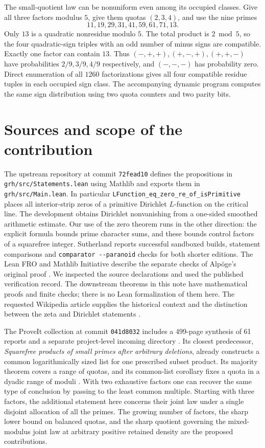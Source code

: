 \documentclass[11pt]{article}
\begin{document}
The small-quotient law can be nonuniform even among its occupied classes. Give all three factors modulus $5$, give them quotas $(2,3,4)$, and use the nine primes
\[
 11,19,29,31,41,59,61,71,13.
\]
Only $13$ is a quadratic nonresidue modulo $5$. The total product is $2\bmod5$, so the four quadratic-sign triples with an odd number of minus signs are compatible. Exactly one factor can contain $13$. Thus $(-,+,+),(+,-,+),(+,+,-)$ have probabilities $2/9,3/9,4/9$ respectively, and $(-,-,-)$ has probability zero. Direct enumeration of all $1260$ factorizations gives all four compatible residue tuples in each occupied sign class. The accompanying dynamic program computes the same sign distribution using two quota counters and two parity bits.

\section{Sources and scope of the contribution}
The upstream repository at commit \texttt{72fead10} defines the propositions in \nolinkurl{grh/src/Statements.lean} using Mathlib and exports them in \nolinkurl{grh/src/Main.lean}. In particular \nolinkurl{LFunction_eq_zero_re_of_isPrimitive} places all interior-strip zeros of a primitive Dirichlet $L$-function on the critical line. The development obtains Dirichlet nonvanishing from a one-sided smoothed arithmetic estimate. Our use of the zero theorem runs in the other direction: the explicit formula bounds prime character sums, and these bounds control factors of a squarefree integer. Sutherland reports successful sandboxed builds, statement comparisons and \nolinkurl{comparator --paranoid} checks for both shorter editions. The Lean FRO and Mathlib Initiative describe the separate checks of Alp\"oge's original proof \cite{lean,suth,fro}. We inspected the source declarations and used the published verification record. The downstream theorems in this note have mathematical proofs and finite checks; there is no Lean formalization of them here. The requested Wikipedia article supplies the historical context and the distinction between the zeta and Dirichlet statements \cite{wiki}.

The ProveIt collection at commit \texttt{041d8032} includes a 499-page synthesis of 61 reports and a separate project-level incoming directory \cite{proveit}. Its closest predecessor, \emph{Squarefree products of small primes after arbitrary deletions}, already constructs a common logarithmically sized list for one prescribed subset product. Its majority theorem covers a range of quotas, and its common-list corollary fixes a quota in a dyadic range of moduli \cite{predecessor}. With two exhaustive factors one can recover the same type of conclusion by passing to the least common multiple. Starting with three factors, the additional statement here concerns their joint law under a single disjoint allocation of all the primes. The growing number of factors, the sharp lower bound on balanced quotas, and the sharp quotient governing the mixed-modulus joint law at arbitrary positive retained density are the proposed contributions.
\end{document}
